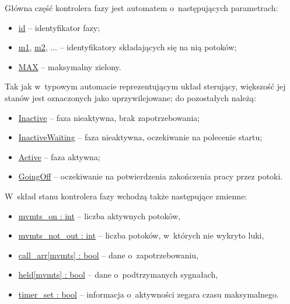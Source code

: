 \documentclass{pracamgr}
\theoremstyle{plain}
\begin{document}
Główna część kontrolera fazy jest automatem o~następujących
parametrach:
\begin{itemize}
  \item \url{id} -- identyfikator fazy;
  \item \url{m1}, \url{m2}, ... -- identyfikatory składających się na
  nią potoków;
  \item \url{MAX} -- maksymalny zielony.
\end{itemize}
Tak jak w~typowym automacie reprezentującym układ sterujący, większość jej
stanów jest oznaczonych jako uprzywilejowane; do pozostałych należą:
\begin{itemize}
  \item \url{Inactive} -- faza nieaktywna, brak zapotrzebowania;
  \item \url{InactiveWaiting} -- faza nieaktywna, oczekiwanie na
  polecenie startu;
  \item \url{Active} -- faza aktywna;
  \item \url{GoingOff} -- oczekiwanie na potwierdzenia zakończenia
  pracy przez potoki.
\end{itemize}
W~skład stanu kontrolera fazy wchodzą także następujące zmienne:
\begin{itemize}
  \item \url{mvmts_on : int} -- liczba aktywnych potoków,
  \item \url{mvmts_not_out : int} -- liczba potoków, w~których nie wykryto luki,
  \item \url{call_arr[mvmts] : bool} -- dane o~zapotrzebowaniu,
  \item \url{held[mvmts] : bool} -- dane o~podtrzymanych sygnałach,
  \item \url{timer_set : bool} -- informacja o~aktywności zegara czasu
  maksymalnego.
\end{itemize}
\end{document}

